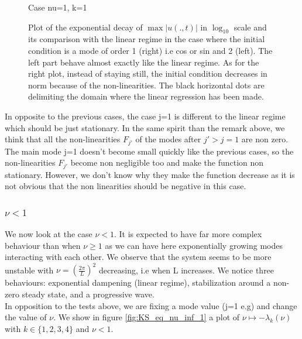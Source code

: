 \documentclass[12pt]{article}
\begin{document}
\begin{figure}[htbp]
\begin{minipage}[b]{0.45\textwidth}
        \caption{Case nu=1, k=1}
        \label{fig:image2}
    \end{minipage}
    \caption{Plot of the exponential decay of $\max|u(.,t)|$ in $\log_{10}$ scale and its comparison with the linear regime in the case where the initial 
    condition is a mode of order 1 (right) i.e cos or sin and 2 (left). The left part behave almost exactly like the 
    linear regime. As for the right plot, instead of staying still, the initial condition decreases in norm because of
     the non-linearities. The black horizontal dots are delimiting the domain where the linear regression has been
      made.}
    \label{fig:both_images}
\end{figure}

In opposite to the previous cases, the case j=1 is different to the linear regime which should be just stationary. In the same spirit than 
the remark above, we think that all the non-linearities $F_{j'}$ of the modes after $j'>j=1$ are non zero. The main mode j=1 doesn't become 
small quickly like the previous cases, so the non-linearities $F_{j'}$ become non negligible too and make the function non stationary. 
However, we don't know why they make the function decrease as it is not obvious that the non linearities should be negative in this case.

\subsubsection{\texorpdfstring{$\nu <1$}{nu < 1}}
We now look at the case $\nu <1$. It is expected to have far more complex behaviour than when $\nu \geq 1$ as we can have here exponentially 
growing modes interacting with each other. We observe that the system seems to be more unstable with $\nu = (\frac{2\pi}{L})^2$ decreasing, i.e when L increases. 
We notice three behaviours: exponential dampening (linear regime), stabilization around a non-zero steady state, and a progressive wave.
\\

In opposition to the tests above, we are fixing a mode value (j=1 e.g) and change the value of $\nu$. We show in figure \ref{fig:KS_eq_nu_inf_1} 
a plot of $\nu \mapsto -\lambda_k(\nu)$ with $k \in \{ 1, 2, 3, 4\}$ and $\nu < 1$.
\end{document}
